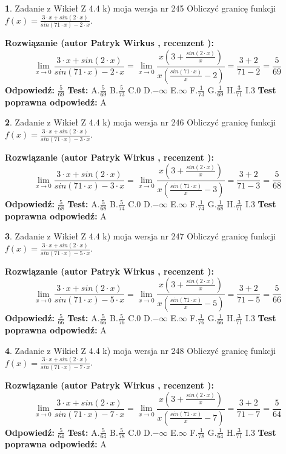 \documentclass[12pt, a4paper]{article}
\theoremstyle{definition} %
\newtheorem{zad}{}
\newcommand{\zadStart}[1]{\begin{zad}#1\newline}
\newcommand{\zadStop}{\end{zad}}
\newcommand{\rozwStart}[2]{\noindent \textbf{Rozwiązanie (autor #1 , recenzent #2): }\newline}
\newcommand{\rozwStop}{\newline}
\newcommand{\odpStart}{\noindent \textbf{Odpowiedź:}\newline}
\newcommand{\odpStop}{\newline}
\newcommand{\testStart}{\noindent \textbf{Test:}\newline}
\newcommand{\testStop}{\newline}
\newcommand{\kluczStart}{\noindent \textbf{Test poprawna odpowiedź:}\newline}
\newcommand{\kluczStop}{\newline}
\begin{document}
\zadStart{Zadanie z Wikieł Z 4.4 k) moja wersja nr 245}
Obliczyć granicę funkcji $f(x)=\frac{3\cdot x +sin(2\cdot x)}{sin(71\cdot x) -2\cdot x}$.
\zadStop
\rozwStart{Patryk Wirkus}{}
$$\lim\limits_{x\to 0}\frac{3\cdot x +sin(2\cdot x)}{sin(71\cdot x) -2\cdot x}
=\lim\limits_{x\to 0}\frac{x(3+\frac{sin(2\cdot x)}{x})}{x(\frac{sin(71\cdot x)}{x}-2)}
=\frac{3+2}{71-2} = \frac{5}{69}$$
\rozwStop
\odpStart
$\frac{5}{69}$
\odpStop
\testStart
A.$\frac{5}{69}$
B.$\frac{5}{73}$
C.$0$
D.$-\infty$
E.$\infty$
F.$\frac{1}{73}$
G.$\frac{1}{69}$
H.$\frac{3}{71}$
I.$3$
\testStop
\kluczStart
A
\kluczStop



\zadStart{Zadanie z Wikieł Z 4.4 k) moja wersja nr 246}
Obliczyć granicę funkcji $f(x)=\frac{3\cdot x +sin(2\cdot x)}{sin(71\cdot x) -3\cdot x}$.
\zadStop
\rozwStart{Patryk Wirkus}{}
$$\lim\limits_{x\to 0}\frac{3\cdot x +sin(2\cdot x)}{sin(71\cdot x) -3\cdot x}
=\lim\limits_{x\to 0}\frac{x(3+\frac{sin(2\cdot x)}{x})}{x(\frac{sin(71\cdot x)}{x}-3)}
=\frac{3+2}{71-3} = \frac{5}{68}$$
\rozwStop
\odpStart
$\frac{5}{68}$
\odpStop
\testStart
A.$\frac{5}{68}$
B.$\frac{5}{74}$
C.$0$
D.$-\infty$
E.$\infty$
F.$\frac{1}{74}$
G.$\frac{1}{68}$
H.$\frac{3}{71}$
I.$3$
\testStop
\kluczStart
A
\kluczStop



\zadStart{Zadanie z Wikieł Z 4.4 k) moja wersja nr 247}
Obliczyć granicę funkcji $f(x)=\frac{3\cdot x +sin(2\cdot x)}{sin(71\cdot x) -5\cdot x}$.
\zadStop
\rozwStart{Patryk Wirkus}{}
$$\lim\limits_{x\to 0}\frac{3\cdot x +sin(2\cdot x)}{sin(71\cdot x) -5\cdot x}
=\lim\limits_{x\to 0}\frac{x(3+\frac{sin(2\cdot x)}{x})}{x(\frac{sin(71\cdot x)}{x}-5)}
=\frac{3+2}{71-5} = \frac{5}{66}$$
\rozwStop
\odpStart
$\frac{5}{66}$
\odpStop
\testStart
A.$\frac{5}{66}$
B.$\frac{5}{76}$
C.$0$
D.$-\infty$
E.$\infty$
F.$\frac{1}{76}$
G.$\frac{1}{66}$
H.$\frac{3}{71}$
I.$3$
\testStop
\kluczStart
A
\kluczStop



\zadStart{Zadanie z Wikieł Z 4.4 k) moja wersja nr 248}
Obliczyć granicę funkcji $f(x)=\frac{3\cdot x +sin(2\cdot x)}{sin(71\cdot x) -7\cdot x}$.
\zadStop
\rozwStart{Patryk Wirkus}{}
$$\lim\limits_{x\to 0}\frac{3\cdot x +sin(2\cdot x)}{sin(71\cdot x) -7\cdot x}
=\lim\limits_{x\to 0}\frac{x(3+\frac{sin(2\cdot x)}{x})}{x(\frac{sin(71\cdot x)}{x}-7)}
=\frac{3+2}{71-7} = \frac{5}{64}$$
\rozwStop
\odpStart
$\frac{5}{64}$
\odpStop
\testStart
A.$\frac{5}{64}$
B.$\frac{5}{78}$
C.$0$
D.$-\infty$
E.$\infty$
F.$\frac{1}{78}$
G.$\frac{1}{64}$
H.$\frac{3}{71}$
I.$3$
\testStop
\kluczStart
A
\kluczStop
\end{document}
